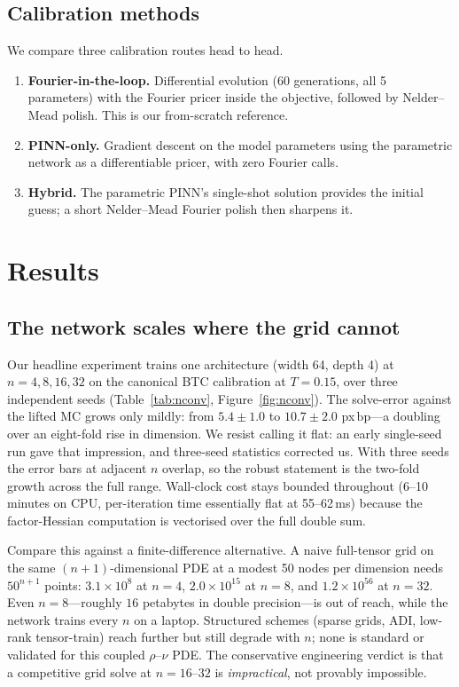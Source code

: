 \documentclass[review,12pt]{elsarticle}
\newcommand{\bp}{\ensuremath{\,\mathrm{bp}}}
\begin{document}
\subsection{Calibration methods}
We compare three calibration routes head to head.
\begin{enumerate}
  \item \textbf{Fourier-in-the-loop.}  Differential evolution (60 generations,
        all 5 parameters) with the Fourier pricer inside the objective, followed
        by Nelder--Mead polish.  This is our from-scratch reference.
  \item \textbf{PINN-only.}  Gradient descent on the model parameters using the
        parametric network as a differentiable pricer, with zero Fourier calls.
  \item \textbf{Hybrid.}  The parametric PINN's single-shot solution provides the
        initial guess; a short Nelder--Mead Fourier polish then sharpens it.
\end{enumerate}

\section{Results}
\label{sec:results}

\subsection{The network scales where the grid cannot}
\label{sec:nconv}
Our headline experiment trains one architecture (width 64, depth 4) at
$n{=}4,8,16,32$ on the canonical BTC calibration at $T{=}0.15$, over three
independent seeds (Table~\ref{tab:nconv}, Figure~\ref{fig:nconv}).  The solve-error
against the lifted MC grows only mildly: from $5.4\pm1.0$ to $10.7\pm2.0$ px\bp---a
doubling over an eight-fold rise in dimension.  We resist calling it flat: an early
single-seed run gave that impression, and three-seed statistics corrected us.  With
three seeds the error bars at adjacent $n$ overlap, so the robust statement is the
two-fold growth across the full range.  Wall-clock cost stays bounded throughout
(6--10 minutes on CPU, per-iteration time essentially flat at 55--62\,ms) because
the factor-Hessian computation is vectorised over the full double sum.

Compare this against a finite-difference alternative.  A naive full-tensor grid on
the same $(n{+}1)$-dimensional PDE at a modest 50 nodes per dimension needs
$50^{n+1}$ points: $3.1\times10^{8}$ at $n{=}4$, $2.0\times10^{15}$ at $n{=}8$,
and $1.2\times10^{56}$ at $n{=}32$.  Even $n{=}8$---roughly $16$ petabytes in double
precision---is out of reach, while the network trains every $n$ on a laptop.
Structured schemes (sparse grids, ADI, low-rank tensor-train) reach further but
still degrade with $n$; none is standard or validated for this coupled
$\rho$--$\nu$ PDE.  The conservative engineering verdict is that a competitive
grid solve at $n{=}16$--$32$ is \emph{impractical}, not provably impossible.
\end{document}
